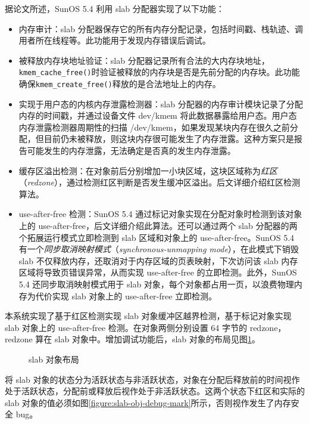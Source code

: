 \documentclass[AutoFakeBold]{LZUThesis}
\begin{document}
\begin{sloppypar}
据论文\cite{bonwick1994slab}所述，SunOS 5.4 利用 slab 分配器实现了以下功能：

\begin{itemize}
\item
  内存审计：slab
  分配器保存它的所有内存分配记录，包括时间戳、栈轨迹、调用者所在线程等。此功能用于发现内存错误后调试。
\item
  被释放内存块地址验证：slab
  分配器记录所有合法的大内存块地址，\texttt{kmem\_cache\_free()}时验证被释放的内存块是否是先前分配的内存块。此功能确保\texttt{kmem\_create\_free()}释放的是合法地址上的内存。
\item
  实现于用户态的内核内存泄露检测器：slab
  分配器的内存审计模块记录了分配内存的时间戳，并通过设备文件 dev/kmem
  将此数据暴露给用户态。用户态内存泄露检测器周期性的扫描
  /dev/kmem，如果发现某块内存在很久之前分配，但目前仍未被释放，则这块内存很可能发生了内存泄露。这种方案只是报告可能发生的内存泄露，无法确定是否真的发生内存泄露。
\item
  缓存区溢出检测：在对象前后分别增加一小块区域，这块区域称为\emph{红区}（\emph{redzone}），通过检测红区判断是否发生缓冲区溢出。后文详细介绍红区检测算法。
\item
  use-after-free 检测：SunOS 5.4
  通过标记对象实现在分配对象时检测到该对象上的
  use-after-free，后文详细介绍此算法。还可以通过两个 slab
  分配器的两个拓展运行模式立即检测到 slab 区域和对象上的
  use-after-free。SunOS 5.4
  有一个\emph{同步取消映射模式}（\emph{synchronous-unmapping
  mode}），在此模式下销毁 slab
  不仅释放内存，还取消对于内存区域的页表映射，下次访问该 slab
  内存区域将导致页错误异常，从而实现 use-after-free
  的立即检测。此外，SunOS 5.4 还同步取消映射模式用于 slab
  对象，每个对象都占用一页，以浪费物理内存为代价实现 slab 对象上的
  use-after-free 立即检测。
\end{itemize}

本系统实现了基于红区检测实现 slab 对象缓冲区越界检测，基于标记对象实现
slab 对象上的 use-after-free 检测。在对象两侧分别设置 64 字节的
redzone，redzone 算在 slab 对象中。增加调试功能后，slab 对象的布局见图\ref{figure:slab-debug-layout}。

\begin{figure}[htb]
\centering

\caption{slab 对象布局}
\label{figure:slab-debug-layout}
\end{figure}

将 slab
对象的状态分为活跃状态与非活跃状态，对象在分配后释放前的时间视作处于活跃状态，分配前或释放后视作处于非活跃状态。这两个状态下红区和实际的
slab 对象的值必须如图\ref{figure:slab-obj-debug-mark}所示，否则视作发生了内存安全 bug。


\end{sloppypar}
\end{document}
